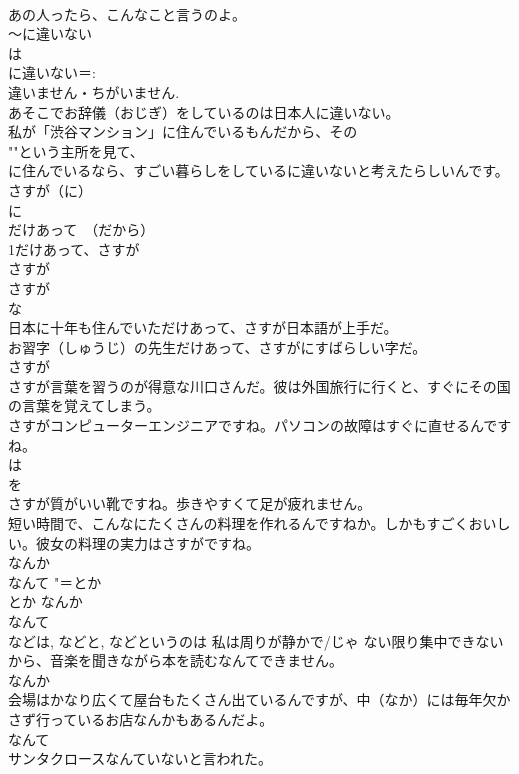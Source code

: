 \documentclass[8pt]{extreport}
\begin{document}
\begin{CJK}{UTF8}{min}
\\	あの人ったら、こんなこと言うのよ。 
\\	～に違いない	
\\	は
\\	に違いない＝: 
\\	違いません・ちがいません. 
\\	あそこでお辞儀（おじぎ）をしているのは日本人に違いない。 
\\	私が「渋谷マンション」に住んでいるもんだから、その
\\	""という主所を見て、
\\	に住んでいるなら、すごい暮らしをしているに違いないと考えたらしいんです。 
\\	さすが（に）	
\\	に 
\\	だけあって　（だから） 
\\	1だけあって、さすが
\\	さすが
\\	さすが
\\	な
\\	日本に十年も住んでいただけあって、さすが日本語が上手だ。 
\\	お習字（しゅうじ）の先生だけあって、さすがにすばらしい字だ。 
\\	さすが
\\	さすが言葉を習うのが得意な川口さんだ。彼は外国旅行に行くと、すぐにその国の言葉を覚えてしまう。 
\\	さすがコンピューターエンジニアですね。パソコンの故障はすぐに直せるんですね。 
\\	は 
\\	を 
\\	さすが質がいい靴ですね。歩きやすくて足が疲れません。 
\\	短い時間で、こんなにたくさんの料理を作れるんですねか。しかもすごくおいしい。彼女の料理の実力はさすがですね。 
\\	なんか 
\\	なんて	"＝とか 
\\	とか なんか 
\\	なんて 
\\	などは, などと, などというのは 私は周りが静かで/じゃ ない限り集中できないから、音楽を聞きながら本を読むなんてできません。 
\\	なんか 
\\	会場はかなり広くて屋台もたくさん出ているんですが、中（なか）には毎年欠かさず行っているお店なんかもあるんだよ。 
\\	なんて 
\\	サンタクロースなんていないと言われた。 

\end{CJK}
\end{document}
